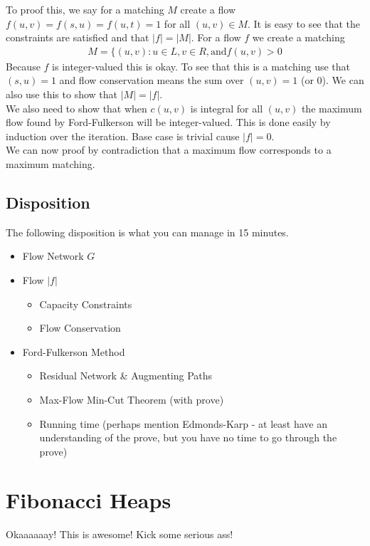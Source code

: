 \documentclass[12pt]{article}
\begin{document}
To proof this, we say for a matching $M$ create a flow $f(u, v) = f(s, u) = f(u, t) = 1$ for all $(u, v) \in M$. It is easy to see that the constraints are satisfied and that $|f| = |M|$. For a flow $f$ we create a matching
\begin{align*}
	M = \{(u, v) : u \in L, v \in R, \text{and} f(u, v) > 0 
\end{align*}
Because $f$ is integer-valued this is okay. To see that this is a matching use that $(s, u) = 1$ and flow conservation means the sum over $(u, v) = 1$ (or $0$). We can also use this to show that $|M| = |f|$. \\

We also need to show that when $c(u, v)$ is integral for all $(u, v)$ the maximum flow found by Ford-Fulkerson will be integer-valued. This is done easily by induction over the iteration. Base case is trivial cause $|f| = 0$.\\

We can now proof by contradiction that a maximum flow corresponds to a maximum matching.

\subsection{Disposition}
The following disposition is what you can manage in 15 minutes. 
\begin{itemize}
	\item Flow Network $G$
	\item Flow $|f|$
		\begin{itemize}
			\item Capacity Constraints
			\item Flow Conservation
		\end{itemize}
	\item Ford-Fulkerson Method
		\begin{itemize}
			\item Residual Network \& Augmenting Paths
			\item Max-Flow Min-Cut Theorem (with prove)
			\item Running time (perhaps mention Edmonds-Karp - at least have an understanding of the prove, but you have no time to go through the prove)
		\end{itemize}
\end{itemize}

\newpage

\section{Fibonacci Heaps}
Okaaaaaay! This is awesome! Kick some serious ass!
%
\end{document}
